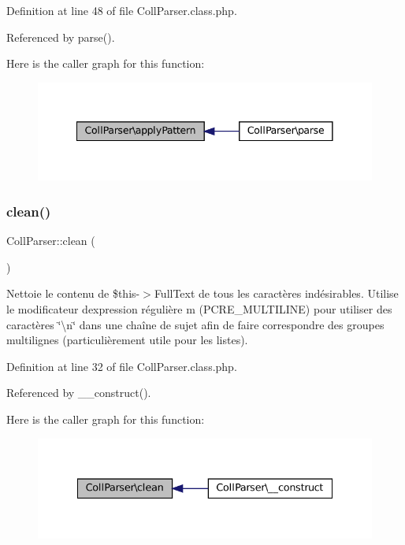 Definition at line 48 of file Coll\+Parser.\+class.\+php.



Referenced by parse().

Here is the caller graph for this function\+:\nopagebreak
\begin{figure}[H]
\begin{center}
\leavevmode
\includegraphics[width=341pt]{class_coll_parser_ad482ec1ae68430dd0a2bdc60faf32ced_icgraph}
\end{center}
\end{figure}
\mbox{\label{class_coll_parser_a8c2cd975c9a254ae394a9335c6037582}} 
\subsubsection{\texorpdfstring{clean()}{clean()}}
{\footnotesize\ttfamily Coll\+Parser\+::clean (\begin{DoxyParamCaption}{ }\end{DoxyParamCaption})\hspace{0.3cm}{\ttfamily [private]}}

Nettoie le contenu de \$this-\/$>$Full\+Text de tous les caractères indésirables. Utilise le modificateur d\textquotesingle{}expression régulière m (P\+C\+R\+E\+\_\+\+M\+U\+L\+T\+I\+L\+I\+NE) pour utiliser des caractères \char`\"{}\textbackslash{}n\char`\"{} dans une chaîne de sujet afin de faire correspondre des groupes multilignes (particulièrement utile pour les listes). 

Definition at line 32 of file Coll\+Parser.\+class.\+php.



Referenced by \+\_\+\+\_\+construct().

Here is the caller graph for this function\+:\nopagebreak
\begin{figure}[H]
\begin{center}
\leavevmode
\includegraphics[width=335pt]{class_coll_parser_a8c2cd975c9a254ae394a9335c6037582_icgraph}
\end{center}
\end{figure}
\mbox{\label{class_coll_parser_a80c4fddf08335fdffd0db37a432dce7b}} 
